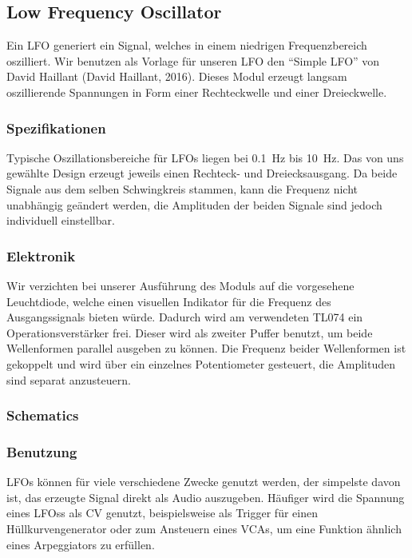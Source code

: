\subsection{Low Frequency Oscillator \label{LFO}}
\label{sec:orgaabe80e}
Ein \ac{LFO} generiert ein Signal, welches in einem niedrigen Frequenzbereich oszilliert. Wir benutzen als Vorlage für unseren \ac{LFO} den "`Simple LFO"' von David Haillant (David Haillant, 2016). Dieses Modul erzeugt langsam oszillierende Spannungen in Form einer Rechteckwelle und einer Dreieckwelle.

\subsubsection{Spezifikationen}
\label{sec:org2d6743d}
Typische Oszillationsbereiche für \acp{LFO} liegen bei \SI{0.1}{\hertz} bis \SI{10}{\hertz}. Das  von uns gewählte Design erzeugt jeweils einen Rechteck- und Dreiecksausgang. Da beide Signale aus dem selben Schwingkreis stammen, kann die Frequenz nicht unabhängig geändert werden, die Amplituden der beiden Signale sind jedoch individuell einstellbar.

\subsubsection{Elektronik}
\label{sec:org21d120b}
Wir verzichten bei unserer Ausführung des Moduls auf die vorgesehene Leuchtdiode, welche einen visuellen Indikator für die Frequenz des Ausgangssignals bieten würde. Dadurch wird am verwendeten TL074 ein Operationsverstärker frei. Dieser wird als zweiter Puffer benutzt, um beide Wellenformen parallel ausgeben zu können. Die Frequenz beider Wellenformen ist gekoppelt und wird über ein einzelnes Potentiometer gesteuert, die Amplituden sind separat anzusteuern.

\subsubsection{Schematics}
\label{sec:orge075177}

\subsubsection{Benutzung}
\label{sec:org6a86c73}
\acp{LFO} können für viele verschiedene Zwecke genutzt werden, der simpelste davon ist, das erzeugte Signal direkt als Audio auszugeben. Häufiger wird die Spannung eines \acp{LFO}s als \acl{CV} genutzt, beispielsweise als Trigger für einen Hüllkurvengenerator oder zum Ansteuern eines \acp{VCA}, um eine Funktion ähnlich eines Arpeggiators zu erfüllen.

